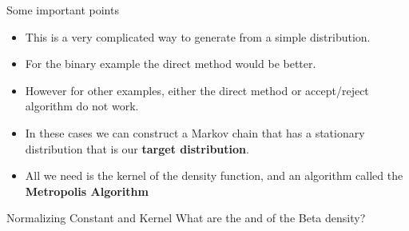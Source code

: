\documentclass[10pt]{beamer}
\begin{document}
\begin{frame}{Some important points}
\begin{itemize}
\item This is a very complicated way to generate from a simple distribution.

\item For the binary example the direct method would be better.

\item However for other examples, either the direct method or accept/reject algorithm do not work.

\item In these cases we can construct a Markov chain that has a stationary distribution that is our {\bf target distribution}.

\item All we need is the kernel of the density function, and an algorithm called the {\bf Metropolis Algorithm}
\end{itemize}
\end{frame}
\begin{frame}{Normalizing Constant and Kernel}
What are the
and
of the Beta density?

\end{frame}
\end{document}
